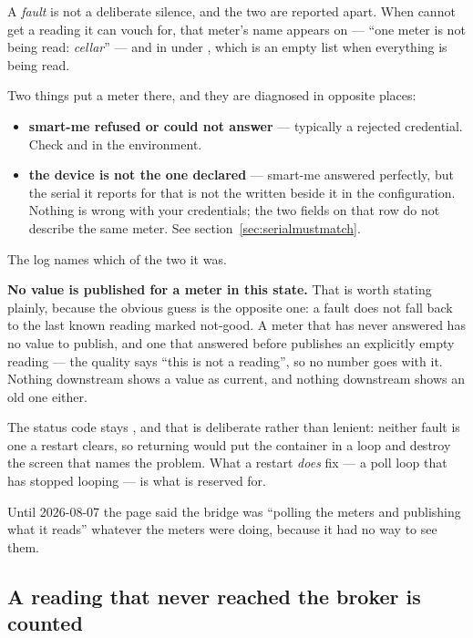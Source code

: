 A \emph{fault} is not a deliberate silence, and the two are reported apart. When \prog cannot
get a reading it can vouch for, that meter's name appears on \code{/} --- ``one meter is not
being read: \emph{cellar}'' --- and in  under , which is
an empty list when everything is being read.

Two things put a meter there, and they are diagnosed in opposite places:

\begin{itemize}
  \item \textbf{smart-me refused or could not answer} --- typically a rejected credential.
        Check  and  in the
        environment.
  \item \textbf{the device is not the one declared} --- smart-me answered perfectly, but the
        serial it reports for that  is not the  written beside
        it in the configuration. Nothing is wrong with your credentials; the two fields on
        that row do not describe the same meter. See
        section~\ref{sec:serialmustmatch}.
\end{itemize}

The log names which of the two it was.

\textbf{No value is published for a meter in this state.} That is worth stating plainly,
because the obvious guess is the opposite one: a fault does not fall back to the last known
reading marked not-good. A meter that has never answered has no value to publish, and one
that answered before publishes an explicitly empty reading --- the quality says ``this is not
a reading'', so no number goes with it. Nothing downstream shows a value as current, and
nothing downstream shows an old one either.

The status code stays , and that is deliberate rather than lenient: neither fault
is one a restart clears, so returning  would put the container in a loop and
destroy the screen that names the problem. What a restart \emph{does} fix --- a poll loop
that has stopped looping --- is what  is reserved for.

Until 2026-08-07 the page said the bridge was ``polling the meters and publishing what it
reads'' whatever the meters were doing, because it had no way to see them.

\subsection{A reading that never reached the broker is counted}
\label{sec:droppedreadings}

